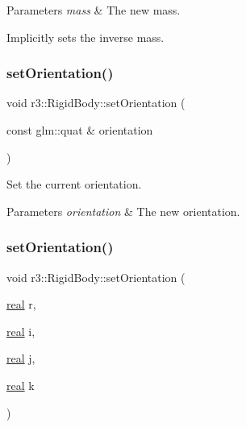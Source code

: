 \begin{DoxyParams}{Parameters}
{\em mass} & The new mass.\\
\hline
\end{DoxyParams}
Implicitly sets the inverse mass. \mbox{\label{classr3_1_1_rigid_body_a2a93ca6f386411f14e5e8b844c214573}} 
\subsubsection{\texorpdfstring{set\+Orientation()}{setOrientation()}\hspace{0.1cm}{\footnotesize\ttfamily [1/2]}}
{\footnotesize\ttfamily void r3\+::\+Rigid\+Body\+::set\+Orientation (\begin{DoxyParamCaption}\item[{const glm\+::quat \&}]{orientation }\end{DoxyParamCaption})}



Set the current orientation. 


\begin{DoxyParams}{Parameters}
{\em orientation} & The new orientation. \\
\hline
\end{DoxyParams}
\mbox{\label{classr3_1_1_rigid_body_a8f6dcfce04ca4add81dce4f140e954c7}} 
\subsubsection{\texorpdfstring{set\+Orientation()}{setOrientation()}\hspace{0.1cm}{\footnotesize\ttfamily [2/2]}}
{\footnotesize\ttfamily void r3\+::\+Rigid\+Body\+::set\+Orientation (\begin{DoxyParamCaption}\item[{\mbox{\hyperlink{namespacer3_ab2016b3e3f743fb735afce242f0dc1eb}{real}}}]{r,  }\item[{\mbox{\hyperlink{namespacer3_ab2016b3e3f743fb735afce242f0dc1eb}{real}}}]{i,  }\item[{\mbox{\hyperlink{namespacer3_ab2016b3e3f743fb735afce242f0dc1eb}{real}}}]{j,  }\item[{\mbox{\hyperlink{namespacer3_ab2016b3e3f743fb735afce242f0dc1eb}{real}}}]{k }\end{DoxyParamCaption})}



